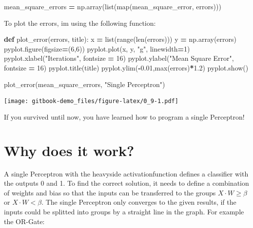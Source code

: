 \documentclass[
]{book}
\newenvironment{Shaded}{\begin{snugshade}}{\end{snugshade}}
\newcommand{\BuiltInTok}[1]{#1}
\newcommand{\DecValTok}[1]{\textcolor[rgb]{0.00,0.00,0.81}{#1}}
\newcommand{\FloatTok}[1]{\textcolor[rgb]{0.00,0.00,0.81}{#1}}
\newcommand{\KeywordTok}[1]{\textcolor[rgb]{0.13,0.29,0.53}{\textbf{#1}}}
\newcommand{\NormalTok}[1]{#1}
\newcommand{\OperatorTok}[1]{\textcolor[rgb]{0.81,0.36,0.00}{\textbf{#1}}}
\newcommand{\StringTok}[1]{\textcolor[rgb]{0.31,0.60,0.02}{#1}}
\begin{document}
\begin{Shaded}
\begin{Highlighting}[]
\NormalTok{mean\_square\_errors }\OperatorTok{=}\NormalTok{ np.array(}\BuiltInTok{list}\NormalTok{(}\BuiltInTok{map}\NormalTok{(mean\_square\_error, errors)))}
\end{Highlighting}
\end{Shaded}

To plot the errors, im using the following function:

\begin{Shaded}
\begin{Highlighting}[]
\KeywordTok{def}\NormalTok{ plot\_error(errors, title):}
\NormalTok{  x }\OperatorTok{=} \BuiltInTok{list}\NormalTok{(}\BuiltInTok{range}\NormalTok{(}\BuiltInTok{len}\NormalTok{(errors)))}
\NormalTok{  y }\OperatorTok{=}\NormalTok{ np.array(errors)}
\NormalTok{  pyplot.figure(figsize}\OperatorTok{=}\NormalTok{(}\DecValTok{6}\NormalTok{,}\DecValTok{6}\NormalTok{))}
\NormalTok{  pyplot.plot(x, y, }\StringTok{"g"}\NormalTok{, linewidth}\OperatorTok{=}\DecValTok{1}\NormalTok{)}
\NormalTok{  pyplot.xlabel(}\StringTok{"Iterations"}\NormalTok{, fontsize }\OperatorTok{=} \DecValTok{16}\NormalTok{)}
\NormalTok{  pyplot.ylabel(}\StringTok{"Mean Square Error"}\NormalTok{, fontsize }\OperatorTok{=} \DecValTok{16}\NormalTok{)}
\NormalTok{  pyplot.title(title)}
\NormalTok{  pyplot.ylim(}\OperatorTok{{-}}\FloatTok{0.01}\NormalTok{,}\BuiltInTok{max}\NormalTok{(errors)}\OperatorTok{*}\FloatTok{1.2}\NormalTok{)}
\NormalTok{  pyplot.show()}
  
  
\NormalTok{plot\_error(mean\_square\_errors, }\StringTok{"Single Perceptron"}\NormalTok{)}
\end{Highlighting}
\end{Shaded}

\texttt{[image: gitbook-demo\_files/figure-latex/0\_9-1.pdf]}

If you survived until now, you have learned how to program a single Perceptron!

\hypertarget{why-does-it-work}{%
\section{Why does it work?}\label{why-does-it-work}}

A single Perceptron with the heavyside activationfunction defines a classifier with the outputs 0 and 1. To find the correct solution, it needs to define a combination of weights and bias so that the inputs can be transferred to the groups \(X \cdot W \geq \beta\) or \(X \cdot W < \beta\). The single Perceptron only converges to the given results, if the inputs could be splitted into groups by a straight line in the graph. For example the OR-Gate:
\end{document}
